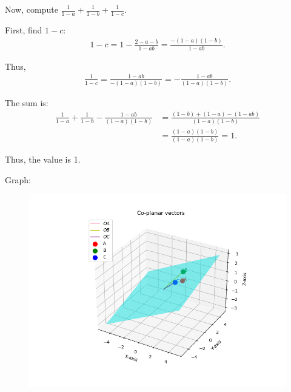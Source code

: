 \documentclass{beamer}
\theoremstyle{remark}
\numberwithin{equation}{section}
\begin{document}
Now, compute \(\frac{1}{1 - a} + \frac{1}{1 - b} + \frac{1}{1 - c}\).

First, find \(1 - c\):
\begin{align}
1 - c = 1 - \frac{2 - a - b}{1 - ab} = \frac{-(1 - a)(1 - b)}{1 - ab}.
\end{align}

Thus,
\begin{align}
\frac{1}{1 - c} = \frac{1 - ab}{-(1 - a)(1 - b)} = -\frac{1 - ab}{(1 - a)(1 - b)}.
\end{align}

The sum is:
\begin{align}
\frac{1}{1 - a} + \frac{1}{1 - b} - \frac{1 - ab}{(1 - a)(1 - b)} &= \frac{(1 - b) + (1 - a) - (1 - ab)}{(1 - a)(1 - b)} \\
&= \frac{(1 - a)(1 - b)}{(1 - a)(1 - b)} = 1.
\end{align}

Thus, the value is 1.


Graph:
\begin{figure}[H]
    \centering
    \includegraphics[scale=0.5]{plot}
    \caption{}
    \label{fig:plot}
\end{figure}
\end{document}

